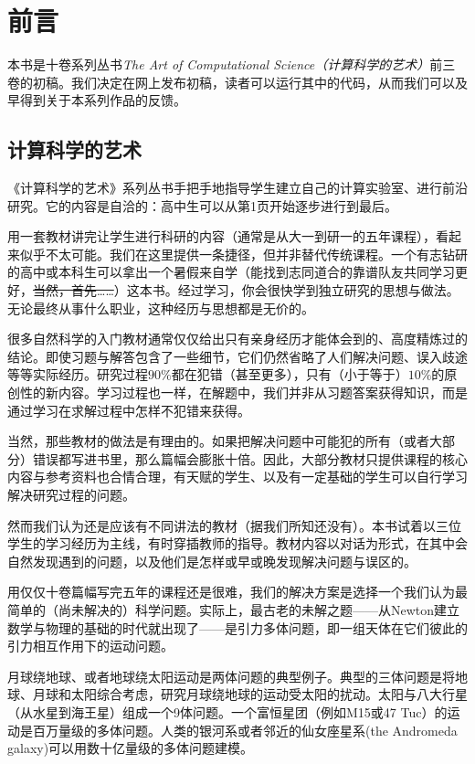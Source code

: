 \chapter*{前言}
本书是十卷系列丛书{\it The Art of Computational Science（计算科学的艺术）}前三卷的初稿。我们决定在网上发布初稿，读者可以运行其中的代码，从而我们可以及早得到关于本系列作品的反馈。

\section*{计算科学的艺术}
《计算科学的艺术》系列丛书手把手地指导学生建立自己的计算实验室、进行前沿研究。它的内容是自洽的：高中生可以从第1页开始逐步进行到最后。

用一套教材讲完让学生进行科研的内容（通常是从大一到研一的五年课程），看起来似乎不太可能。我们在这里提供一条捷径，但并非替代传统课程。一个有志钻研的高中或本科生可以拿出一个暑假来自学（能找到志同道合的靠谱队友共同学习更好，\sout{当然，首先……}）这本书。经过学习，你会很快学到独立研究的思想与做法。无论最终从事什么职业，这种经历与思想都是无价的。

很多自然科学的入门教材通常仅仅给出只有亲身经历才能体会到的、高度精炼过的结论。即使习题与解答包含了一些细节，它们仍然省略了人们解决问题、误入歧途等等实际经历。研究过程$90\%$都在犯错（甚至更多），只有（小于等于）$10\%$的原创性的新内容。学习过程也一样，在解题中，我们并非从习题答案获得知识，而是通过学习在求解过程中怎样不犯错来获得。

当然，那些教材的做法是有理由的。如果把解决问题中可能犯的所有（或者大部分）错误都写进书里，那么篇幅会膨胀十倍。因此，大部分教材只提供课程的核心内容与参考资料也合情合理，有天赋的学生、以及有一定基础的学生可以自行学习解决研究过程的问题。

然而我们认为还是应该有不同讲法的教材（据我们所知还没有）。本书试着以三位学生的学习经历为主线，有时穿插教师的指导。教材内容以对话为形式，在其中会自然发现遇到的问题，以及他们是怎样或早或晚发现解决问题与误区的。

用仅仅十卷篇幅写完五年的课程还是很难，我们的解决方案是选择一个我们认为最简单的（尚未解决的）科学问题。实际上，最古老的未解之题——从Newton建立数学与物理的基础的时代就出现了——是引力多体问题，即一组天体在它们彼此的引力相互作用下的运动问题。

月球绕地球、或者地球绕太阳运动是两体问题的典型例子。典型的三体问题是将地球、月球和太阳综合考虑，研究月球绕地球的运动受太阳的扰动。太阳与八大行星（从水星到海王星）组成一个9体问题。一个富恒星团（例如M15或47 Tuc）的运动是百万量级的多体问题。人类的银河系或者邻近的仙女座星系(the Andromeda galaxy)可以用数十亿量级的多体问题建模。

